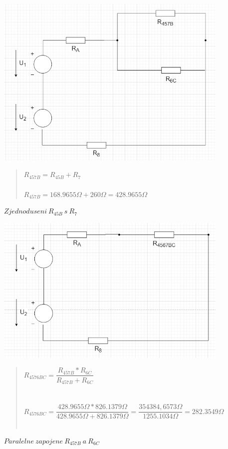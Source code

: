 \begin{figure}[H]
    \centering
    \includegraphics[scale=0.5]{picturesFor1Uloha/4.png}
    \caption{$ Zjednoduseni \: R_{45B} \: s \: R_7$}
    \label{fig:Serial_resistor_R457B}
    \begin{quote}
    \centering
    $R_{457B} = R_{45B} + R_7 $  \\~\\
    $R_{457B} = 168.9655\Omega + 260\Omega = 428.9655\Omega$
    \end{quote}
\end{figure}

\begin{figure}[H]
    \centering
    \includegraphics[scale=0.5]{picturesFor1Uloha/5.png}
    \caption{$Paralelne \: zapojene \: R_{457B} \: a \: R_{6C}$}
    \label{fig:Paralel_resistor_R4576BC}
    \begin{quote}
         \centering
        $R_{4576BC} =  \dfrac{R_{457B} * R_{6C}}{R_{457B} + R_{6C}} $  \\~\\~\\
        $R_{4576BC} =  \dfrac{428.9655\Omega * 826.1379\Omega}{428.9655\Omega + 826.1379\Omega} = \dfrac{354 384,6573\Omega}{1255.1034\Omega} = 282.3549\Omega $  \\~\\
    \end{quote}
\end{figure}

